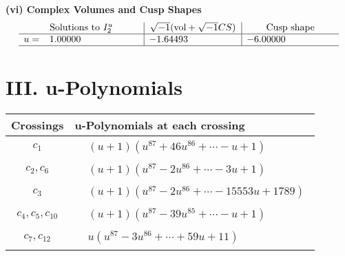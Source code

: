 \documentclass[1p]{elsarticle_modified}
\theoremstyle{definition}
\newcommand{\I}{\sqrt{-1}}
\begin{document}
\newpage\flushleft \textbf{(vi) Complex Volumes and Cusp Shapes}
$$\begin{array}{c|c|c}  
\text{Solutions to }I^u_{2}& \I (\text{vol} + \sqrt{-1}CS) & \text{Cusp shape}\\
 \hline 
\begin{aligned}
u &= \phantom{-}1.00000\phantom{ +0.000000I}\end{aligned}
 & -1.64493\phantom{ +0.000000I} & -6.00000\phantom{ +0.000000I}\\
 \hline 
 \end{array}$$\newpage
\newpage\renewcommand{\arraystretch}{1}
\centering \section*{ III. u-Polynomials}
\begin{tabular}{m{50pt}|m{274pt}}
Crossings & \hspace{64pt}u-Polynomials at each crossing \\
\hline $$\begin{aligned}c_{1}\end{aligned}$$&$\begin{aligned}
&(u+1)(u^{87}+46 u^{86}+\cdots- u+1)
\end{aligned}$\\
\hline $$\begin{aligned}c_{2},c_{6}\end{aligned}$$&$\begin{aligned}
&(u+1)(u^{87}-2 u^{86}+\cdots-3 u+1)
\end{aligned}$\\
\hline $$\begin{aligned}c_{3}\end{aligned}$$&$\begin{aligned}
&(u+1)(u^{87}-2 u^{86}+\cdots-15553 u+1789)
\end{aligned}$\\
\hline $$\begin{aligned}c_{4},c_{5},c_{10}\end{aligned}$$&$\begin{aligned}
&(u+1)(u^{87}-39 u^{85}+\cdots- u+1)
\end{aligned}$\\
\hline $$\begin{aligned}c_{7},c_{12}\end{aligned}$$&$\begin{aligned}
&u(u^{87}-3 u^{86}+\cdots+59 u+11)
\end{aligned}$\\

\end{tabular}
\end{document}
